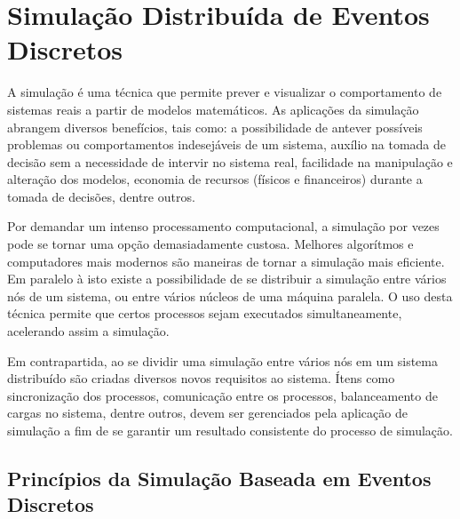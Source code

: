 \chapter{Simulação Distribuída de Eventos Discretos}


A simulação é uma técnica que permite prever e visualizar o comportamento de sistemas reais a partir de modelos matemáticos. As aplicações da simulação abrangem diversos benefícios, tais como: a possibilidade de antever possíveis problemas ou comportamentos indesejáveis de um sistema, auxílio na tomada de decisão sem a necessidade de intervir no sistema real, facilidade na manipulação e alteração dos modelos, economia de recursos (físicos e financeiros) durante a tomada de decisões, dentre outros.


Por demandar um intenso processamento computacional, a simulação por vezes pode se tornar uma opção demasiadamente custosa. Melhores algorítmos e computadores mais modernos são maneiras de tornar a simulação mais eficiente. Em paralelo à isto existe a possibilidade de se distribuir a simulação entre vários nós de um sistema, ou entre vários núcleos de uma máquina paralela. O uso desta técnica permite que certos processos sejam executados simultaneamente, acelerando assim a simulação.


Em contrapartida, ao se dividir uma simulação entre vários nós em um sistema distribuído são criadas diversos novos requisitos ao sistema. Ítens como sincronização dos processos, comunicação entre os processos, balanceamento de cargas no sistema, dentre outros, devem ser gerenciados pela aplicação de simulação a fim de se garantir um resultado consistente do processo de simulação.

\section{Princípios da Simulação Baseada em Eventos Discretos}


